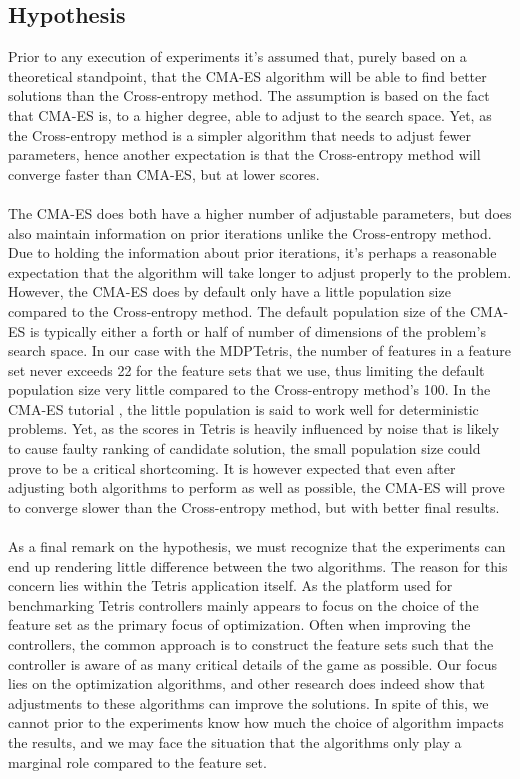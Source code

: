 \subsection{Hypothesis}

Prior to any execution of experiments it's assumed that, purely based 
on a theoretical standpoint, that the CMA-ES algorithm will be able to 
find better solutions than the Cross-entropy method. The assumption is based 
on the fact that CMA-ES is, to a higher degree, able to adjust to the 
search space. Yet, as the Cross-entropy method is a simpler algorithm that needs 
to adjust fewer parameters, hence another expectation is that the Cross-entropy
method will converge faster than CMA-ES, but at lower scores.\\
\\
The CMA-ES does both have a higher number of adjustable parameters, but does also
maintain information on prior iterations unlike the Cross-entropy method.
Due to holding the information about prior iterations, it's perhaps a reasonable
expectation that the algorithm will take longer to adjust properly to the
problem. However, the CMA-ES does by default only have a little population size 
compared to the Cross-entropy method. The default population size of the CMA-ES is
typically either a forth or half of number of dimensions of the problem's search space.
In our case with the MDPTetris, the number of features in a feature set never exceeds
22 for the feature sets that we use,
thus limiting the default population size very little compared to the Cross-entropy method's 
100. In the CMA-ES tutorial \citep{hansen2011}, the little population is said to
work well for deterministic problems. Yet, as the scores in Tetris is heavily
influenced by noise that is likely to cause faulty ranking of candidate solution,
the small population size could prove to be a critical shortcoming.
It is however expected that even after adjusting both algorithms to perform as 
well as possible, the CMA-ES will prove to converge slower than the Cross-entropy method, but
with better final results.\\
\\
As a final remark on the hypothesis, we must recognize that the experiments can 
end up rendering little difference between the two algorithms. The reason for 
this concern lies within the Tetris application itself. As the platform used for benchmarking 
Tetris controllers mainly appears to focus on the choice of the feature set as the primary
focus of optimization. Often when improving the controllers, the common approach is to
construct the feature sets such that the controller is aware of as many critical 
details of the game as possible. Our focus lies on the optimization algorithms,
and other research does indeed show that adjustments to these algorithms can 
improve the solutions. In spite of this, we cannot prior to the experiments know how much
the choice of algorithm impacts the results, and we may face the situation that 
the algorithms only play a marginal role compared to the feature set.
